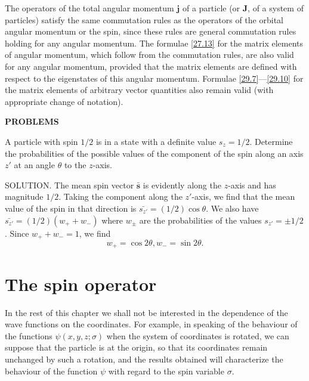 The operators of the total angular momentum $ \bm{j} $ of a particle (or $ \bm{J} $, of a system of particles) satisfy the same commutation rules as the operators of the orbital angular momentum or the spin, since these rules are general commutation rules holding for any angular momentum. The formulae \eqref{27.13} for the matrix elements of angular momentum, which follow from the commutation rules, are also valid for any angular momentum, provided that the matrix elements are defined with respect to the eigenstates of this angular momentum. Formulae \eqref{29.7}—\eqref{29.10} for the matrix elements of arbitrary vector quantities also remain valid (with appropriate change of notation).





{\small
	
\textbf{PROBLEMS}


A particle with spin $ 1/2 $ is in a state with a definite value $ s_z = 1/2 $. Determine the probabilities of the possible values of the component of the spin along an axis $ z' $ at an angle $\theta$ to the $ z $-axis.





SOLUTION. The mean spin vector $ \bar{\bm{s}} $ is evidently along the $ z $-axis and has magnitude $ 1/2 $. Taking the component along the $ z' $-axis, we find that the mean value of the spin in that direction is $ \bar{s_{z'}}=(1/2)\cos\theta $. We also have $ \bar{s_{z'}}=(1/2)(w_++w_-) $ where $ w_\pm $ are the probabilities of the values $ s_{z'} = \pm1/2 $. Since $ w_++w_-= 1 $, we find 
\[ w_+ = \cos2\theta, w_- = \sin2\theta. \] }





\section{The spin operator}\label{The spin operator}
In the rest of this chapter we shall not be interested in the dependence of the wave functions on the coordinates. For example, in speaking of the behaviour of the functions $ \psi(x, y, z; \sigma) $ when the system of coordinates is rotated, we can suppose that the particle is at the origin, so that its coordinates remain unchanged by such a rotation, and the results obtained will characterize the behaviour of the function $ \psi $ with regard to the spin variable $ \sigma $.

